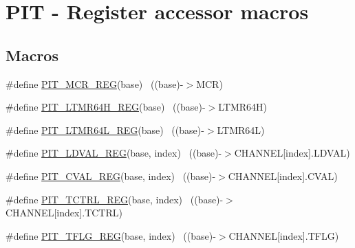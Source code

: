 \hypertarget{group___p_i_t___register___accessor___macros}{}\section{P\+IT -\/ Register accessor macros}
\label{group___p_i_t___register___accessor___macros}
\subsection*{Macros}
\begin{DoxyCompactItemize}
\item 
\#define \hyperlink{group___p_i_t___register___accessor___macros_ga557d2712a651961dcd5ffc4f04673239}{P\+I\+T\+\_\+\+M\+C\+R\+\_\+\+R\+EG}(base)                                            ~((base)-\/$>$M\+CR)
\item 
\#define \hyperlink{group___p_i_t___register___accessor___macros_gaceb428eb9c33daef7dad0ac03bd5102d}{P\+I\+T\+\_\+\+L\+T\+M\+R64\+H\+\_\+\+R\+EG}(base)                                    ~((base)-\/$>$L\+T\+M\+R64H)
\item 
\#define \hyperlink{group___p_i_t___register___accessor___macros_ga963e3dbc0c45569ec8366a0b2a6255f2}{P\+I\+T\+\_\+\+L\+T\+M\+R64\+L\+\_\+\+R\+EG}(base)                                    ~((base)-\/$>$L\+T\+M\+R64L)
\item 
\#define \hyperlink{group___p_i_t___register___accessor___macros_ga2fe8b64df48316de72596736de1bbb00}{P\+I\+T\+\_\+\+L\+D\+V\+A\+L\+\_\+\+R\+EG}(base,  index)                            ~((base)-\/$>$C\+H\+A\+N\+N\+EL\mbox{[}index\mbox{]}.L\+D\+V\+AL)
\item 
\#define \hyperlink{group___p_i_t___register___accessor___macros_ga0513f6bb6550d10e2877f1918dfdc80e}{P\+I\+T\+\_\+\+C\+V\+A\+L\+\_\+\+R\+EG}(base,  index)                              ~((base)-\/$>$C\+H\+A\+N\+N\+EL\mbox{[}index\mbox{]}.C\+V\+AL)
\item 
\#define \hyperlink{group___p_i_t___register___accessor___macros_ga4c2f72ad95fb4104612b319ce7a7d4d9}{P\+I\+T\+\_\+\+T\+C\+T\+R\+L\+\_\+\+R\+EG}(base,  index)                            ~((base)-\/$>$C\+H\+A\+N\+N\+EL\mbox{[}index\mbox{]}.T\+C\+T\+RL)
\item 
\#define \hyperlink{group___p_i_t___register___accessor___macros_ga79831c0452f96ca1b71292189ad382eb}{P\+I\+T\+\_\+\+T\+F\+L\+G\+\_\+\+R\+EG}(base,  index)                              ~((base)-\/$>$C\+H\+A\+N\+N\+EL\mbox{[}index\mbox{]}.T\+F\+LG)

\end{DoxyCompactItemize}
